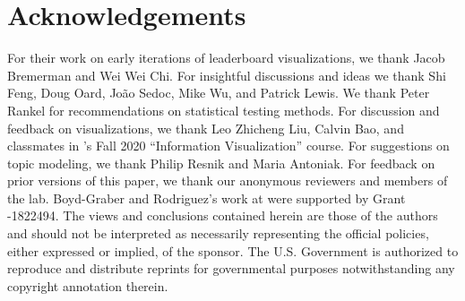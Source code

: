 \section*{Acknowledgements}

For their work on early iterations of leaderboard visualizations, we thank Jacob Bremerman and Wei Wei Chi.
For insightful discussions and ideas we thank Shi Feng, Doug Oard, João Sedoc, Mike Wu, and Patrick Lewis.
We thank Peter Rankel for recommendations on statistical testing methods.
For discussion and feedback on visualizations, we thank Leo Zhicheng Liu, Calvin Bao, and classmates in 's Fall 2020 ``Information Visualization'' course.
For suggestions on topic modeling, we thank Philip Resnik and Maria Antoniak.
For feedback on prior versions of this paper, we thank our anonymous  reviewers and members of the   lab.
Boyd-Graber and Rodriguez's work at  were supported by  Grant -1822494.
The views and conclusions contained herein are those of the authors and should not be interpreted as necessarily representing the official policies, either expressed or implied, of the sponsor.
The U.S. Government is authorized to reproduce and distribute reprints for governmental purposes notwithstanding any copyright annotation therein.
